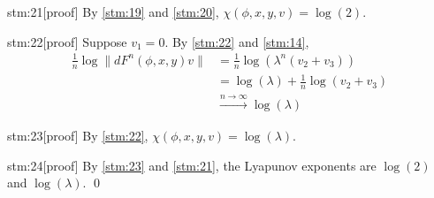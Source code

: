 \documentclass{article}
\begin{document}
\begin{stm}{stm:21}[proof]
By \ref{stm:19} and \ref{stm:20}, $\chi(\phi, x, y, v) = \log(2)$.
\end{stm}

\begin{stm}{stm:22}[proof]
Suppose $v_1 = 0$. By \ref{stm:22} and \ref{stm:14},
\begin{align*}
\frac{1}{n} \log \| dF^n(\phi, x, y)v \| 
&= \frac{1}{n} \log (\lambda^n (v_2 + v_3)) \\
&= \log(\lambda) + \frac{1}{n} \log(v_2 + v_3) \\
&\xrightarrow{n \to \infty} \log(\lambda)
\end{align*}
\end{stm}

\begin{stm}{stm:23}[proof]
By \ref{stm:22}, $\chi(\phi, x, y, v) = \log(\lambda)$.
\end{stm}

\begin{stm}{stm:24}[proof]
By \ref{stm:23} and \ref{stm:21}, the Lyapunov exponents are $\log(2)$ and $\log(\lambda)$. \qed
\end{stm}
\end{document}
